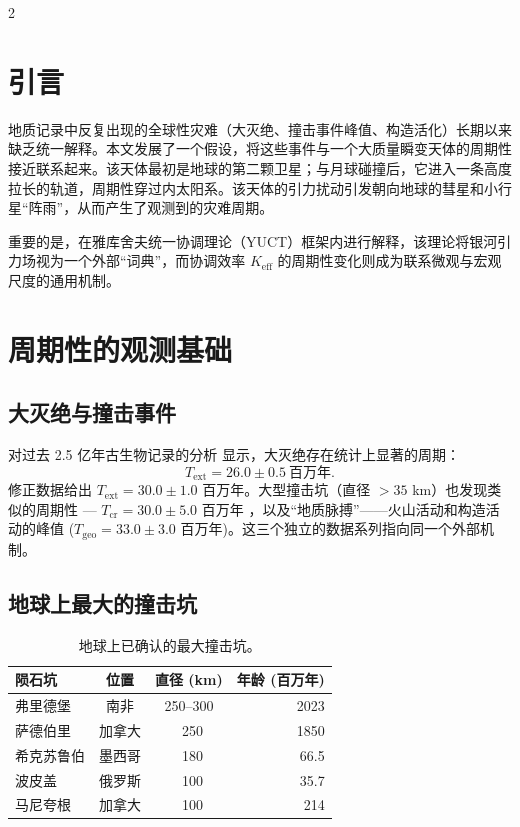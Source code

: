 \documentclass[11pt,a4paper]{article}
\begin{document}
	\begin{multicols}{2}
		
		\section{引言}
		
		地质记录中反复出现的全球性灾难（大灭绝、撞击事件峰值、构造活化）长期以来缺乏统一解释。本文发展了一个假设，将这些事件与一个大质量瞬变天体的周期性接近联系起来。该天体最初是地球的第二颗卫星；与月球碰撞后，它进入一条高度拉长的轨道，周期性穿过内太阳系。该天体的引力扰动引发朝向地球的彗星和小行星“阵雨”，从而产生了观测到的灾难周期。
		
		重要的是，在雅库舍夫统一协调理论（YUCT）框架内进行解释，该理论将银河引力场视为一个外部“词典”，而协调效率 \(K_{\mathrm{eff}}\) 的周期性变化则成为联系微观与宏观尺度的通用机制。
		
		\section{周期性的观测基础}
		
		\subsection{大灭绝与撞击事件}
		
		对过去 2.5 亿年古生物记录的分析 \cite{Raup1984, Melott2010} 显示，大灭绝存在统计上显著的周期：
		\[
		T_{\text{ext}} = 26.0 \pm 0.5\ \text{百万年}.
		\]
		修正数据给出 \(T_{\text{ext}} = 30.0 \pm 1.0\) 百万年。大型撞击坑（直径 \(>35\) km）也发现类似的周期性 — \(T_{\text{cr}} = 30.0 \pm 5.0\) 百万年 \cite{RampinoStothers1984}，以及“地质脉搏”——火山活动和构造活动的峰值 (\(T_{\text{geo}} = 33.0 \pm 3.0\) 百万年)。这三个独立的数据系列指向同一个外部机制。
		
		\subsection{地球上最大的撞击坑}
		
		\begin{table}[htbp]
			\centering
			\caption{地球上已确认的最大撞击坑。}
			\label{tab:craters}
			\footnotesize
			\begin{tabular}{lccr}
				\toprule
				\textbf{陨石坑} & \textbf{位置} & \textbf{直径 (km)} & \textbf{年龄 (百万年)} \\
				\midrule
				弗里德堡 & 南非 & 250–300 & 2023 \\
				萨德伯里 & 加拿大 & ~250 & 1850 \\
				希克苏鲁伯 & 墨西哥 & ~180 & 66.5 \\
				波皮盖 & 俄罗斯 & ~100 & 35.7 \\
				马尼夸根 & 加拿大 & ~100 & 214 \\
				\bottomrule
			\end{tabular}
		\end{table}
		

\end{multicols}
\end{document}
